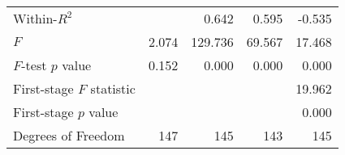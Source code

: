 \begin{tabular}{lrrrr}
Within-$R^2$              &          &    0.642 &     0.595 &                         -0.535 \\ 
$F$                       &    2.074 &  129.736 &    69.567 &                         17.468 \\ 
$F$-test $p$ value        &    0.152 &    0.000 &     0.000 &                          0.000 \\ 
First-stage $F$ statistic &          &          &           &                         19.962 \\ 
First-stage $p$ value     &          &          &           &                          0.000 \\ 
Degrees of Freedom        &      147 &      145 &       143 &                            145 \\ 
\bottomrule
\end{tabular}
